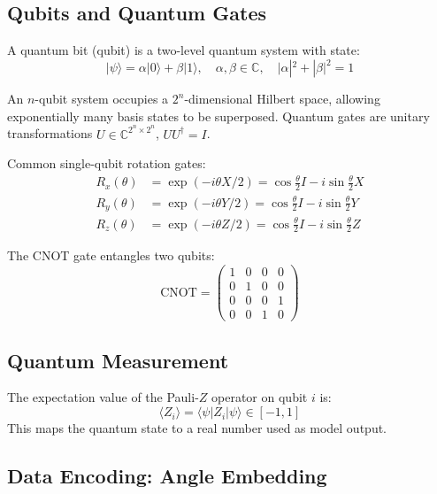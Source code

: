 \documentclass[journal]{IEEEtran}
\newcommand{\ket}[1]{|#1\rangle}
\newcommand{\bra}[1]{\langle #1|}
\newcommand{\expect}[1]{\langle #1 \rangle}
\begin{document}
\subsection{Qubits and Quantum Gates}

A quantum bit (qubit) is a two-level quantum system with state:
\begin{equation}
  \ket{\psi} = \alpha\ket{0} + \beta\ket{1}, \quad
  \alpha,\beta \in \mathbb{C}, \quad |\alpha|^2 + |\beta|^2 = 1
\end{equation}

An $n$-qubit system occupies a $2^n$-dimensional Hilbert space, allowing
exponentially many basis states to be superposed. Quantum gates are unitary
transformations $U \in \mathbb{C}^{2^n \times 2^n}$, $UU^\dagger = I$.

Common single-qubit rotation gates:
\begin{align}
  R_x(\theta) &= \exp(-i\theta X/2) = \cos\tfrac{\theta}{2}I - i\sin\tfrac{\theta}{2}X \\
  R_y(\theta) &= \exp(-i\theta Y/2) = \cos\tfrac{\theta}{2}I - i\sin\tfrac{\theta}{2}Y \\
  R_z(\theta) &= \exp(-i\theta Z/2) = \cos\tfrac{\theta}{2}I - i\sin\tfrac{\theta}{2}Z
\end{align}

The CNOT gate entangles two qubits:
\begin{equation}
  \text{CNOT} = \begin{pmatrix} 1&0&0&0\\ 0&1&0&0\\ 0&0&0&1\\ 0&0&1&0 \end{pmatrix}
\end{equation}

\subsection{Quantum Measurement}

The expectation value of the Pauli-$Z$ operator on qubit $i$ is:
\begin{equation}
  \expect{Z_i} = \bra{\psi}Z_i\ket{\psi} \in [-1, 1]
\end{equation}
This maps the quantum state to a real number used as model output.

\subsection{Data Encoding: Angle Embedding}
\end{document}
